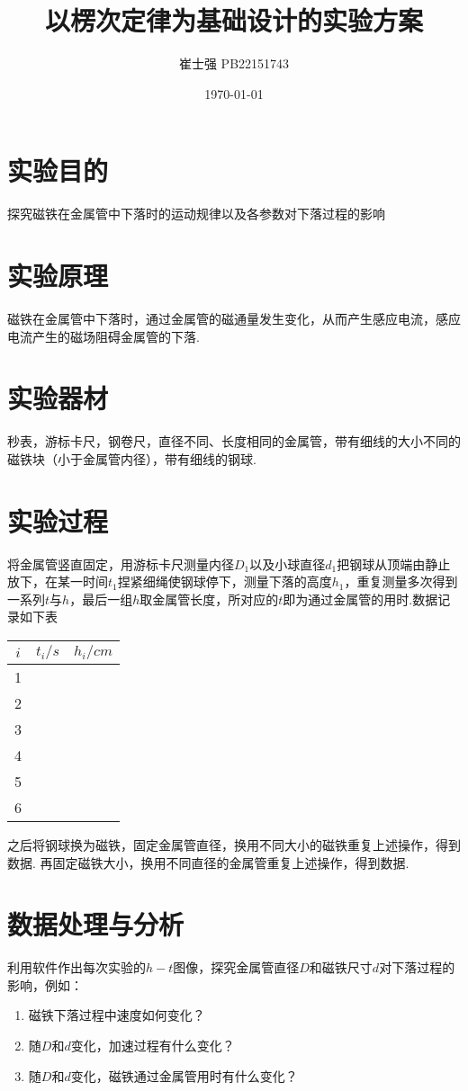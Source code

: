 \documentclass[UTF8]{ctexart}
\title{以楞次定律为基础设计的实验方案}
\author{崔士强 PB22151743}
\date{\today}
\begin{document}
\maketitle
\section{实验目的}
探究磁铁在金属管中下落时的运动规律以及各参数对下落过程的影响
\section{实验原理}
磁铁在金属管中下落时，通过金属管的磁通量发生变化，从而产生感应电流，感应电流产生的磁场阻碍金属管的下落.
\section{实验器材}
秒表，游标卡尺，钢卷尺，直径不同、长度相同的金属管，带有细线的大小不同的磁铁块（小于金属管内径），带有细线的钢球.
\section{实验过程}
将金属管竖直固定，用游标卡尺测量内径$D_1$以及小球直径$d_1$把钢球从顶端由静止放下，在某一时间$t_1$捏紧细绳使钢球停下，测量下落的高度$h_1$，重复测量多次得到一系列$t$与$h$，最后一组$h$取金属管长度，所对应的$t$即为通过金属管的用时.数据记录如下表
\begin{table}[H]\centering
    \begin{tabularx}{150pt}{cYY}
        \hline\hline
        $i$ & $t_i/s$ & $h_i/cm$\\
        \\
        2\\
        3\\
        4\\
        5\\
        6\\
        \hline\hline
    \end{tabularx}%
\end{table}
之后将钢球换为磁铁，固定金属管直径，换用不同大小的磁铁重复上述操作，得到数据. 再固定磁铁大小，换用不同直径的金属管重复上述操作，得到数据.
\section{数据处理与分析}
利用软件作出每次实验的$h-t$图像，探究金属管直径$D$和磁铁尺寸$d$对下落过程的影响，例如：
\begin{enumerate}
    \item 磁铁下落过程中速度如何变化？
    \item 随$D$和$d$变化，加速过程有什么变化？
    \item 随$D$和$d$变化，磁铁通过金属管用时有什么变化？
\end{enumerate}


\end{document}
